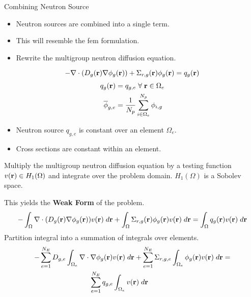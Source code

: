\begin{frame}{Combining Neutron Source}
  \begin{itemize}
    \item Neutron sources are combined into a single term.
    \item This will resemble the \gls{fem} formulation.
    \item Rewrite the multigroup neutron diffusion equation.
  \end{itemize}
  \begin{equation}
    \label{eq:multigroup_source}
    - \mathbf{\nabla} \cdot( D_g(\mathbf{r}) \mathbf{\nabla} \phi_g(\mathbf{r})) + \Sigma_{r,g}(\mathbf{r}) \phi_g(\mathbf{r}) = 
      q_g(\mathbf{r})
  \end{equation}
  \begin{align}
    q_g(\mathbf{r}) &= q_{g,e} \; \forall \; \mathbf{r} \in \Omega_e \\
    \overline{\phi}_{g,e} &= \frac{1}{N_p} \sum_{i \in \Omega_e}^{N_p} \phi_{i,g}
  \end{align}

  \begin{itemize}
    \item Neutron source $q_{g,e}$ is constant over an element $\Omega_e$.
    \item Cross sections are constant within an element.
  \end{itemize}
\end{frame}

\begin{frame}{}
  Multiply the multigroup neutron diffusion equation by a testing function
  $v(\mathbf{r}) \in H_1(\Omega)$ and integrate over the problem domain. $H_1(\Omega)$
  is a Sobolev space.
  
  \vspace{0.25in}
  This yields the \textbf{Weak Form} of the problem.
  \begin{equation}
    \label{eq:fem_weak_form}
    - \int_{\Omega} \mathbf{\nabla} \cdot (D_g(\mathbf{r}) \mathbf{\nabla} \phi_g(\mathbf{r})) v(\mathbf{r}) \; d\mathbf{r}
      + \int_{\Omega} \Sigma_{r,g}(\mathbf{r}) \phi_g(\mathbf{r}) v(\mathbf{r}) \;d\mathbf{r} =
      \int_{\Omega} q_g(\mathbf{r}) v(\mathbf{r}) \;d\mathbf{r}
  \end{equation}
  Partition integral into a summation of integrals over elements.
  \begin{multline}
    \label{eq:element_by_element}
    -\sum_{e=1}^{N_E} D_{g,e} 
      \int_{\Omega_e} \mathbf{\nabla} \cdot \mathbf{\nabla} \phi_g(\mathbf{r}) v(\mathbf{r}) \; d\mathbf{r} +
      \sum_{e=1}^{N_E} \Sigma_{r,g,e} \int_{\Omega_e} \phi_g(\mathbf{r}) v(\mathbf{r}) 
      \;d\mathbf{r} = 
    \\
      \sum_{e=1}^{N_E} q_{g,e} \int_{\Omega_e} v(\mathbf{r}) 
      \; d\mathbf{r} \hspace{0.5in}
  \end{multline}
\end{frame}

